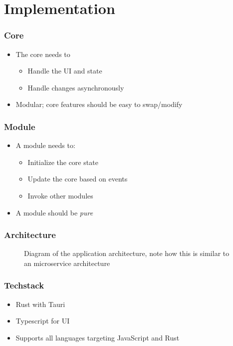 \section{Implementation}
\SectionPage

\begin{frame}
  \frametitle{Core}
  \begin{itemize}
    \pause
    \item The core needs to
      \pause
      \begin{itemize}
        \item Handle the UI and state
        \pause
        \item Handle changes asynchronously
      \end{itemize}
    \pause
    \item Modular; core features should be easy to swap/modify
  \end{itemize}
\end{frame}

\begin{frame}
  \frametitle{Module}
  \begin{itemize}
    \pause
    \item A module needs to:
      \pause
      \begin{itemize}
        \item Initialize the core state
        \pause
        \item Update the core based on events
        \pause
        \item Invoke other modules
      \end{itemize}
      \pause
    \item A module should be \textit{pure}
  \end{itemize}
\end{frame}

\begin{frame}
  \frametitle{Architecture}
  \begin{figure}[H]
    \centering
    
    \caption{
      Diagram of the application architecture, note how this is similar to an microservice architecture
    }
  \end{figure}
\end{frame}

\begin{frame}
  \frametitle{Techstack}
  \begin{itemize}
    \pause
    \item Rust with Tauri
    \pause
    \item Typescript for UI
    \pause
    \item Supports all languages targeting JavaScript and Rust
  \end{itemize}
\end{frame}

